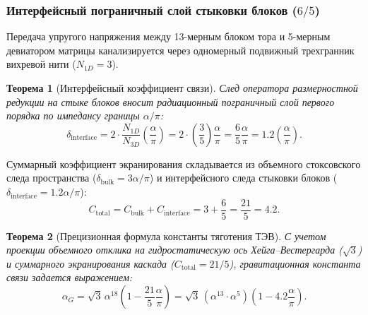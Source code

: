 \documentclass[11pt,a4paper]{article}
\newtheorem{theorem}{Теорема}
\theoremstyle{definition}
\theoremstyle{remark}
\begin{document}
\subsubsection{Интерфейсный пограничный слой стыковки блоков ($6/5$)}

Передача упругого напряжения между 13-мерным блоком тора и 5-мерным девиатором матрицы канализируется через одномерный подвижный трехгранник вихревой нити ($N_{1D} = 3$).

\begin{theorem}[Интерфейсный коэффициент связи]
\label{thm:interface_coupling_layer}
След оператора размерностной редукции на стыке блоков вносит радиационный пограничный слой первого порядка по импедансу границы $\alpha/\pi$:
\begin{equation}
	\delta_{\mathrm{interface}} = 2 \cdot \frac{N_{1D}}{N_{3D}} \left(\frac{\alpha}{\pi}\right) = 2 \cdot \left(\frac{3}{5}\right)\frac{\alpha}{\pi} = \frac{6}{5}\frac{\alpha}{\pi} = 1.2 \left(\frac{\alpha}{\pi}\right).
	\label{eq:interface_coupling_layer_val}
\end{equation}
\end{theorem}

Суммарный коэффициент экранирования складывается из объемного стоксовского следа пространства ($\delta_{\mathrm{bulk}} = 3\alpha/\pi$) и интерфейсного следа стыковки блоков ($\delta_{\mathrm{interface}} = 1.2\alpha/\pi$):
\begin{equation}
	C_{\mathrm{total}} = C_{\mathrm{bulk}} + C_{\mathrm{interface}} = 3 + \frac{6}{5} = \frac{21}{5} = 4.2.
	\label{eq:total_screening_twenty_one_fifths}
\end{equation}

\begin{theorem}[Прецизионная формула константы тяготения ТЭВ]
	\label{thm:alphaG_exact_formula}
	С учетом проекции объемного отклика на гидростатическую ось Хейга--Вестергарда ($\sqrt{3}$) и суммарного экранирования каскада ($C_{\mathrm{total}} = 21/5$), гравитационная константа связи задается выражением:
	\begin{equation}
		\alpha_G = \sqrt{3} \, \alpha^{18} \left( 1 - \frac{21}{5}\frac{\alpha}{\pi} \right) = \sqrt{3} \, (\alpha^{13} \cdot \alpha^5) \left( 1 - 4.2 \frac{\alpha}{\pi} \right).
		\label{eq:alphaG_refined_exact_formula}
	\end{equation}
\end{theorem}
\end{document}
